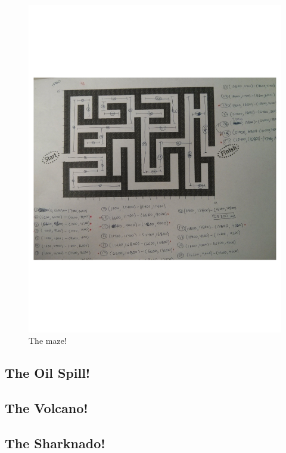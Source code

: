 \documentclass{sig-alternate}
\begin{document}
\begin{figure}
\begin{center}
\includegraphics[width=.9\columnwidth]{figures/maze.pdf}
\end{center}
\caption{The maze!}
\label{fig:maze}
\end{figure}

\subsection{The Oil Spill!}


\subsection{The Volcano!}


\subsection{The Sharknado!}
\end{document}
